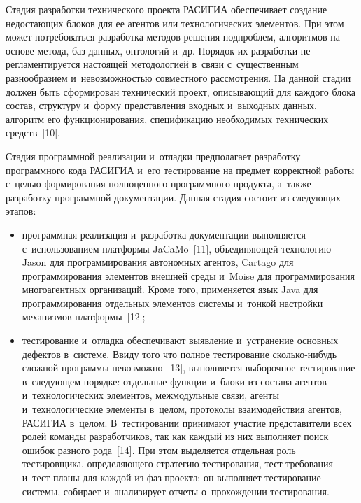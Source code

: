 \begin{multicols}{2}
  Стадия разработки технического проекта \mbox{РАСИГИА} обеспечивает 
создание недостающих блоков для ее агентов или технологических элементов. 
При этом может по\-тре\-бо\-вать\-ся разработка методов решения под\-проб\-лем, 
алгоритмов на основе метода, баз данных, онтологий и~др. Порядок их 
разработки не регламентируется на\-сто\-ящей методологией в~связи 
с~существенным разнообразием и~не\-воз\-мож\-ностью совместного рас\-смот\-ре\-ния. 
На данной стадии должен быть сформирован технический проект, 
опи\-сы\-ва\-ющий для каждого блока со\-став, структуру и~форму пред\-став\-ле\-ния 
входных и~выходных данных, алгоритм его функционирования, спецификацию 
необходимых технических средств~[10].
  
  Стадия программной реализации и~отладки предполагает разработку 
программного кода \mbox{РАСИГИА} и~его тестирование на предмет 
корректной работы с~\mbox{целью} формирования полноценного программного 
продукта, а~так\-же разработку программной документации. Данная стадия 
со\-сто\-ит из сле\-ду\-ющих этапов:
  \begin{itemize}
  \item программная реализация и~разработка документации выполняется 
с~использованием платформы JaCaMo~[11], объединяющей технологию Jason 
для программирования автономных агентов, Cartago для программирования 
элементов внеш\-ней среды и~Moise для программирования многоагентных 
организаций. Кроме того, применяется язык Java для программирования 
отдельных элементов сис\-те\-мы и~тонкой настройки механизмов 
платформы~[12];
  \item тестирование и~отладка обеспечивают выявление и~устранение 
основных дефектов в~сис\-те\-ме. Ввиду того что полное тестирование  
сколь\-ко-ни\-будь слож\-ной программы не\-воз\-мож\-но~[13], выполняется 
выборочное тестирование в~сле\-ду\-ющем порядке: отдельные функ\-ции и~блоки 
из состава аген\-тов и~технологических элементов, межмодульные связи, агенты 
и~технологические элементы в~целом, протоколы взаимодействия агентов, 
\mbox{РАСИГИА} в~целом. В~тес\-ти\-ро\-ва\-нии принимают участие 
представители всех ролей команды разработчиков, так как каж\-дый из них 
выполняет поиск ошибок разного рода~[14]. При этом выделяется отдельная 
роль тестировщика, опре\-де\-ля\-юще\-го стратегию тес\-ти\-ро\-ва\-ния,  
тест-тре\-бо\-ва\-ния и~тест-пла\-ны для каждой из фаз проекта; он выполняет 
тестирование сис\-те\-мы, собирает и~анализирует отчеты о~про\-хож\-де\-нии 
тестирования. 
\end{itemize}


\end{multicols}
